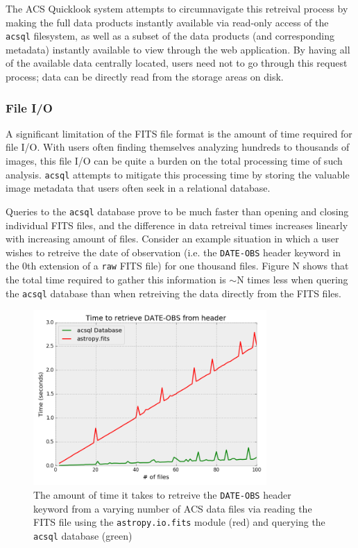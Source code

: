 \documentclass[10pt,journal,compsoc]{IEEEtran}
\begin{document}
The ACS Quicklook system attempts to circumnavigate this retreival process by making
the full data products instantly available via read-only access of the \texttt{acsql}
filesystem, as well as a subset of the data products (and corresponding metadata)
instantly available to view through the web application.  By having all of the available
data centrally located, users need not to go through this request process; data can
be directly read from the storage areas on disk.

\subsubsection{File I/O}

A significant limitation of the FITS file format is the amount of time required for
file I/O.  With users often finding themselves analyzing hundreds to thousands of
images, this file I/O can be quite a burden on the total processing time of such
analysis.  \texttt{acsql} attempts to mitigate this processing time by storing the
valuable image metadata that users often seek in a relational database.

Queries to the \texttt{acsql} database prove to be much faster than opening and
closing individual FITS files, and the difference in data retreival times increases
linearly with increasing amount of files.  Consider an example situation in which a
user wishes to retreive the date of observation (i.e. the \texttt{DATE-OBS} header
keyword in the 0th extension of a \texttt{raw} FITS file) for one thousand files.
Figure N shows that the total time required to gather this information is $\sim$N times less
when quering the \texttt{acsql} database than when retreiving the data directly from
the FITS files.

\begin{figure}[!t]
\centering
\includegraphics[width=3.5in]{./figures/fileio_time.png}
\caption{The amount of time it takes to retreive the \texttt{DATE-OBS} header keyword
from a varying number of ACS data files via reading the FITS file using the
\texttt{astropy.io.fits} module (red) and querying the \texttt{acsql} database (green)}
\label{fig1}
\end{figure}
\end{document}
